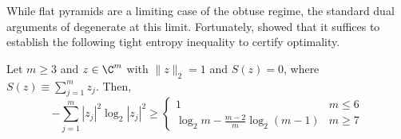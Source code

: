 \documentclass[11pt]{article}
\begin{document}
While flat pyramids are a limiting case of the obtuse regime, the standard dual arguments of \citep{holevo2025quantum} degenerate at this limit. Fortunately, \citep{holevo2025quantum} showed that it suffices to establish the following tight entropy inequality to certify optimality. 
\begin{theorem}\label{thm:flat-ineq}
Let $m\geq 3$ and $z\in \C^m $ with $\|z\|_2=1$ and $S(z)=0$, where $S(z)\equiv \sum_{j=1}^m z_j$. Then, 
\begin{equation}\label{eq:flat-ineq}
    -\sum_{j=1}^m |z_j|^2 \log_2 |z_j|^2 \geq \begin{cases}
        1 & m \leq 6\\
        \log_2 m -\frac{m-2}{m}\log_2(m-1) & m \geq 7
    \end{cases}
\end{equation}    
\end{theorem}
\end{document}
